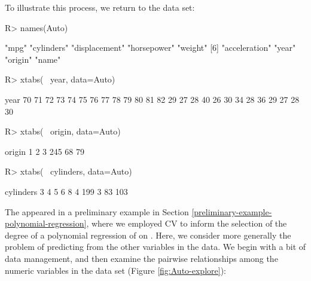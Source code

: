 \documentclass[
]{jss}
\begin{document}
To illustrate this process, we return to the  data set:

\begin{CodeChunk}
\begin{CodeInput}
R> names(Auto)
\end{CodeInput}
\begin{CodeOutput}
[1] "mpg"          "cylinders"    "displacement" "horsepower"   "weight"      
[6] "acceleration" "year"         "origin"       "name"        
\end{CodeOutput}
\begin{CodeInput}
R> xtabs(~ year, data=Auto)
\end{CodeInput}
\begin{CodeOutput}
year
70 71 72 73 74 75 76 77 78 79 80 81 82 
29 27 28 40 26 30 34 28 36 29 27 28 30 
\end{CodeOutput}
\begin{CodeInput}
R> xtabs(~ origin, data=Auto)
\end{CodeInput}
\begin{CodeOutput}
origin
  1   2   3 
245  68  79 
\end{CodeOutput}
\begin{CodeInput}
R> xtabs(~ cylinders, data=Auto)
\end{CodeInput}
\begin{CodeOutput}
cylinders
  3   4   5   6   8 
  4 199   3  83 103 
\end{CodeOutput}
\end{CodeChunk}

The  appeared in a preliminary example in Section
\ref{preliminary-example-polynomial-regression}, where we employed CV to
inform the selection of the degree of a polynomial regression of
 on . Here, we consider more generally the
problem of predicting  from the other variables in the
 data. We begin with a bit of data management, and then
examine the pairwise relationships among the numeric variables in the
data set (Figure \ref{fig:Auto-explore}):
\end{document}
